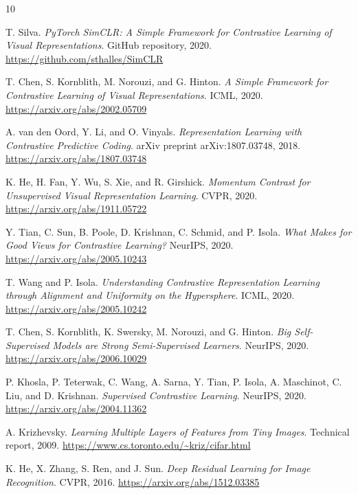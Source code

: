 \documentclass[10pt]{article}
\begin{document}
\begin{thebibliography}{10}

T. Silva.
\textit{PyTorch SimCLR: A Simple Framework for Contrastive Learning of Visual Representations}.
GitHub repository, 2020.
\url{https://github.com/sthalles/SimCLR}


T. Chen, S. Kornblith, M. Norouzi, and G. Hinton.
\textit{A Simple Framework for Contrastive Learning of Visual Representations}.
ICML, 2020.
\url{https://arxiv.org/abs/2002.05709}


A. van den Oord, Y. Li, and O. Vinyals.
\textit{Representation Learning with Contrastive Predictive Coding}.
arXiv preprint arXiv:1807.03748, 2018.
\url{https://arxiv.org/abs/1807.03748}

K. He, H. Fan, Y. Wu, S. Xie, and R. Girshick.
\textit{Momentum Contrast for Unsupervised Visual Representation Learning}.
CVPR, 2020.
\url{https://arxiv.org/abs/1911.05722}

Y. Tian, C. Sun, B. Poole, D. Krishnan, C. Schmid, and P. Isola.
\textit{What Makes for Good Views for Contrastive Learning?}
NeurIPS, 2020.
\url{https://arxiv.org/abs/2005.10243}

T. Wang and P. Isola.
\textit{Understanding Contrastive Representation Learning through Alignment and Uniformity on the Hypersphere}.
ICML, 2020.
\url{https://arxiv.org/abs/2005.10242}

T. Chen, S. Kornblith, K. Swersky, M. Norouzi, and G. Hinton.
\textit{Big Self-Supervised Models are Strong Semi-Supervised Learners}.
NeurIPS, 2020.
\url{https://arxiv.org/abs/2006.10029}

P. Khosla, P. Teterwak, C. Wang, A. Sarna, Y. Tian, P. Isola, A. Maschinot, C. Liu, and D. Krishnan.
\textit{Supervised Contrastive Learning}.
NeurIPS, 2020.
\url{https://arxiv.org/abs/2004.11362}

A. Krizhevsky.
\textit{Learning Multiple Layers of Features from Tiny Images}.
Technical report, 2009.
\url{https://www.cs.toronto.edu/~kriz/cifar.html}

K. He, X. Zhang, S. Ren, and J. Sun.
\textit{Deep Residual Learning for Image Recognition}.
CVPR, 2016.
\url{https://arxiv.org/abs/1512.03385}

\end{thebibliography}
\end{document}
